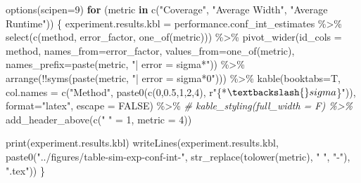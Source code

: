 \documentclass[
]{article}
\newenvironment{Shaded}{\begin{snugshade}}{\end{snugshade}}
\newcommand{\AttributeTok}[1]{\textcolor[rgb]{0.77,0.63,0.00}{#1}}
\newcommand{\CommentTok}[1]{\textcolor[rgb]{0.56,0.35,0.01}{\textit{#1}}}
\newcommand{\ConstantTok}[1]{\textcolor[rgb]{0.00,0.00,0.00}{#1}}
\newcommand{\ControlFlowTok}[1]{\textcolor[rgb]{0.13,0.29,0.53}{\textbf{#1}}}
\newcommand{\DecValTok}[1]{\textcolor[rgb]{0.00,0.00,0.81}{#1}}
\newcommand{\FloatTok}[1]{\textcolor[rgb]{0.00,0.00,0.81}{#1}}
\newcommand{\FunctionTok}[1]{\textcolor[rgb]{0.00,0.00,0.00}{#1}}
\newcommand{\NormalTok}[1]{#1}
\newcommand{\OtherTok}[1]{\textcolor[rgb]{0.56,0.35,0.01}{#1}}
\newcommand{\SpecialCharTok}[1]{\textcolor[rgb]{0.00,0.00,0.00}{#1}}
\newcommand{\StringTok}[1]{\textcolor[rgb]{0.31,0.60,0.02}{#1}}
\begin{document}
\begin{Shaded}
\begin{Highlighting}[]
\FunctionTok{options}\NormalTok{(}\AttributeTok{scipen=}\DecValTok{9}\NormalTok{)}
\ControlFlowTok{for}\NormalTok{ (metric }\ControlFlowTok{in} \FunctionTok{c}\NormalTok{(}\StringTok{"Coverage"}\NormalTok{, }\StringTok{"Average Width"}\NormalTok{, }\StringTok{"Average Runtime"}\NormalTok{)) \{}
\NormalTok{  experiment.results.kbl }\OtherTok{=}\NormalTok{ performance.conf\_int\_estimates }\SpecialCharTok{\%\textgreater{}\%}
    \FunctionTok{select}\NormalTok{(}\FunctionTok{c}\NormalTok{(method, error\_factor, }\FunctionTok{one\_of}\NormalTok{(metric))) }\SpecialCharTok{\%\textgreater{}\%}
    \FunctionTok{pivot\_wider}\NormalTok{(}\AttributeTok{id\_cols =}\NormalTok{ method,}
              \AttributeTok{names\_from=}\NormalTok{error\_factor,}
              \AttributeTok{values\_from=}\FunctionTok{one\_of}\NormalTok{(metric),}
              \AttributeTok{names\_prefix=}\FunctionTok{paste}\NormalTok{(metric, }\StringTok{"| error = sigma*"}\NormalTok{)) }\SpecialCharTok{\%\textgreater{}\%}
    \FunctionTok{arrange}\NormalTok{(}\SpecialCharTok{!!}\FunctionTok{syms}\NormalTok{(}\FunctionTok{paste}\NormalTok{(metric, }\StringTok{"| error = sigma*0"}\NormalTok{))) }\SpecialCharTok{\%\textgreater{}\%}
    \FunctionTok{kable}\NormalTok{(}\AttributeTok{booktabs=}\NormalTok{T, }\AttributeTok{col.names =} \FunctionTok{c}\NormalTok{(}\StringTok{"Method"}\NormalTok{, }\FunctionTok{paste0}\NormalTok{(}\FunctionTok{c}\NormalTok{(}\DecValTok{0}\NormalTok{,}\FloatTok{0.5}\NormalTok{,}\DecValTok{1}\NormalTok{,}\DecValTok{2}\NormalTok{,}\DecValTok{4}\NormalTok{), r}\StringTok{"\{*$\textbackslash{}sigma$\}"}\NormalTok{)), }\AttributeTok{format=}\StringTok{"latex"}\NormalTok{, }\AttributeTok{escape =} \ConstantTok{FALSE}\NormalTok{) }\SpecialCharTok{\%\textgreater{}\%}
    \CommentTok{\# kable\_styling(full\_width = F) \%\textgreater{}\%}
    \FunctionTok{add\_header\_above}\NormalTok{(}\FunctionTok{c}\NormalTok{(}\StringTok{" "} \OtherTok{=} \DecValTok{1}\NormalTok{, }\AttributeTok{metric =} \DecValTok{4}\NormalTok{))}
  
  \FunctionTok{print}\NormalTok{(experiment.results.kbl)}
  \FunctionTok{writeLines}\NormalTok{(experiment.results.kbl, }\FunctionTok{paste0}\NormalTok{(}\StringTok{"../figures/table{-}sim{-}exp{-}conf{-}int{-}"}\NormalTok{, }\FunctionTok{str\_replace}\NormalTok{(}\FunctionTok{tolower}\NormalTok{(metric), }\StringTok{" "}\NormalTok{, }\StringTok{"{-}"}\NormalTok{), }\StringTok{".tex"}\NormalTok{))}
\NormalTok{\}}
\end{Highlighting}
\end{Shaded}
\end{document}
